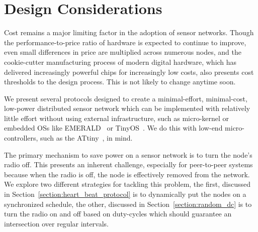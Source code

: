 \section{Design Considerations}

Cost remains a major limiting factor in the adoption of sensor networks.  Though the performance-to-price ratio of
hardware is expected to continue to improve, even small differences in price are multiplied across numerous nodes,
and the cookie-cutter manufacturing process of modern digital hardware, which has delivered increasingly powerful
chips for increasingly low costs, also presents cost thresholds to the design process.  This is not likely to change
anytime soon.

We present several protocols designed to create a minimal-effort, minimal-cost, low-power distributed sensor network
which can be implemented with relatively little effort without using external infrastructure, such as micro-kernel or
embedded OSs like EMERALD~\cite{zuberi99} or TinyOS~\cite{tinyos}.  We do this with low-end micro-controllers, such
as the ATtiny~\cite{attinyds}, in mind.

The primary mechanism to save power on a sensor network is to turn the node's radio off.  This presents an inherent
challenge, especially for peer-to-peer systems because when the radio is off, the node is effectively removed from
the network.  We explore two different strategies for tackling this problem, the first, discussed in
Section~\ref{section:heart_beat_protocol} is to dynamically put the nodes
on a synchronized schedule, the other, discussed in Section~\ref{section:random_dc} is to turn the radio on and off
based on duty-cycles which should guarantee an intersection over regular intervals.

